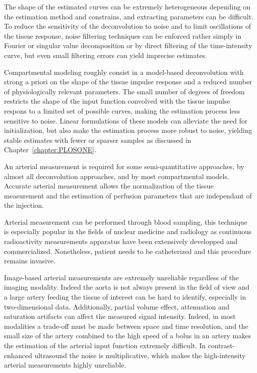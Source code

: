 The shape of the estimated curves can be extremely heterogeneous depending on the estimation method and constrains, and extracting parameters can be difficult. 
To reduce the sensitivity of the deconvolution to noise and to limit oscillations of the tissue response, noise filtering techniques can be enforced rather simply in Fourier or singular value decomposition or by direct filtering of the time-intensity curve, but even small filtering errors can yield imprecise estimates.

Compartmental modeling roughly consist in a model-based deconvolution with strong a priori on the shape of the tissue impulse response and a reduced number of physiologically relevant parameters. 
The small number of degrees of freedom restricts the shape of the input function convolved with the tissue impulse respons to a limited set of possible curves, making the estimation process less sensitive to noise.
Linear formulations of these models can alleviate the need for initialization, but also make the estimation process more robust to noise, yielding stable estimates with fewer or sparser samples as discussed in Chapter~\ref{chapter:PLOSONE}.

An arterial measurement is required for some semi-quantitative approaches, by almost all deconvolution approaches, and by most compartmental models. 
Accurate arterial measurement allows the normalization of the tissue measurement and the estimation of perfusion parameters that are independant of the injection.

Arterial measurement can be performed through blood sampling, this technique is especially popular in the fields of nuclear medicine and radiology as continuous radioactivity measurements apparatus have been extensively developped and commercialized.
Nonetheless, patient needs to be catheterized and this procedure remains invasive. 

Image-based arterial measurements are extremely unreliable regardless of the imaging modality. 
Indeed the aorta is not always present in the field of view and a large artery feeding the tissue of interest can be hard to identify, especially in two-dimensional data.
Additionally, partial volume effect, attenuation and saturation artifacts can affect the measured signal intensity.
Indeed, in most modalities a trade-off must be made between space and time resolution, and the small size of the artery combined to the high speed of a bolus in an artery makes the estimation of the arterial input function extremely difficult.
In contrast-enhanced ultrasound the noise is multiplicative, which makes the high-intensity arterial measurements highly unreliable.

